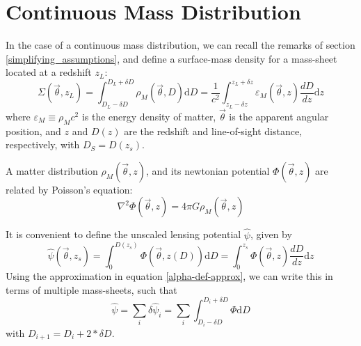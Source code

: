 \documentclass[12pt,preprint]{aastex}			%
\newcommand{\dd}{\mathrm{d}} %
\begin{document}
\section{Continuous Mass Distribution}
In the case of a continuous mass distribution, we can recall the remarks of section \ref{simplifying_assumptions}, and define a surface-mass density for a mass-sheet located at a redshift $z_L$:
\begin{equation}
  \label{sigma-def}
  \Sigma(\vec{\theta},z_L) 
  = \int_{D_L-\delta D}^{D_L+\delta D}\rho_M(\vec{\theta},D)\dd D 
  = \frac{1}{c^2}\int_{z_L - \delta z}^{z_L + \delta z} 
  \varepsilon_M(\vec{\theta},z)\frac{dD}{dz}\dd z
\end{equation}
where $\varepsilon_M \equiv \rho_M c^2$ is the energy density of matter,
$\vec{\theta}$ is the apparent angular position, and $z$ and $D(z)$ are the 
redshift and line-of-sight distance, respectively, with $D_S = D(z_s)$.  

A matter distribution $\rho_M(\vec{\theta},z)$, and its newtonian potential $\Phi(\vec{\theta},z)$ are related by Poisson's equation:
\begin{equation}
  \label{poisson}
  \nabla^2 \Phi(\vec{\theta},z) = 4\pi G \rho_M(\vec{\theta},z)
\end{equation}

It is convenient to define the unscaled lensing potential $\hat{\psi}$, 
given by
\begin{equation}
  \hat{\psi}(\vec{\theta},z_s) 
  = \int_{0}^{D(z_s)} \Phi(\vec{\theta},z(D))\dd D 
  = \int_{0}^{z_s}\Phi(\vec{\theta},z)\frac{dD}{dz}\dd z
\end{equation}
Using the approximation in equation \ref{alpha-def-approx}, we can write this in terms of multiple mass-sheets, such that
\begin{equation}
  \hat{\psi} = \sum_i \delta \hat{\psi}_i 
  = \sum_i \int_{D_i-\delta D}^{D_i+\delta D}\Phi \dd D
\end{equation}
with $D_{i+1} = D_i + 2*\delta D$.
\end{document}
